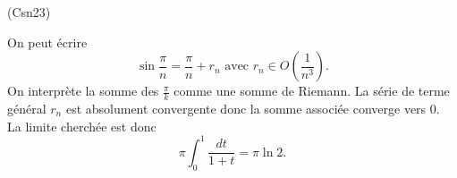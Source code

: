 \begin{tiny}(Csn23)\end{tiny} On peut écrire 
\begin{displaymath}
 \sin \frac{\pi}{n} = \frac{\pi}{n} + r_n
 \text{ avec }
 r_n \in O(\frac{1}{n^3}).
\end{displaymath}
On interprète la somme des $\frac{\pi}{k}$ comme une somme de Riemann. La série de terme général $r_n$ est absolument convergente donc la somme associée converge vers $0$. La limite cherchée est donc
\begin{displaymath}
 \pi\int_{0}^{1}\frac{dt}{1+t} 
 = \pi \ln 2.
\end{displaymath}
